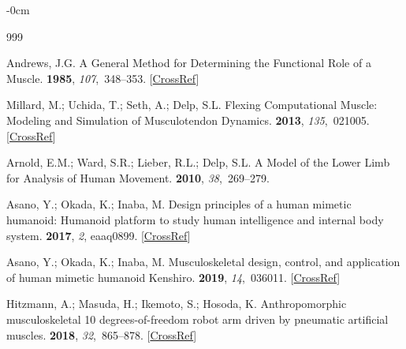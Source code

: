 \documentclass[actuators,article,accept,pdftex,moreauthors]{Definitions/mdpi}
\begin{document}
\clearpage
\begin{adjustwidth}{-\extralength}{0cm}

\begin{thebibliography}{999}

Andrews, J.G.
\newblock A {General} {Method} for {Determining} the {Functional} {Role} of a
{Muscle}.
 {\bf 1985}, {\em
107},~348--353. [\href{http://dx.doi.org/10.1115/1.3138568}{CrossRef}]

Millard, M.; Uchida, T.; Seth, A.; Delp, S.L.
\newblock Flexing {Computational} {Muscle}: {Modeling} and {Simulation} of
{Musculotendon} {Dynamics}.
 {\bf 2013}, {\em
135},~021005. [\href{http://dx.doi.org/10.1115/1.4023390}{CrossRef}]

Arnold, E.M.; Ward, S.R.; Lieber, R.L.; Delp, S.L.
\newblock A {Model} of the {Lower} {Limb} for {Analysis} of {Human} {Movement}.
 {\bf 2010}, {\em 38},{~269--279.}

Asano, Y.; Okada, K.; Inaba, M.
\newblock Design principles of a human mimetic humanoid: {Humanoid} platform to
study human intelligence and internal body system.
 {\bf 2017}, {\em 2}, eaaq0899. [\href{http://dx.doi.org/10.1126/scirobotics.aaq0899}{CrossRef}]

Asano, Y.; Okada, K.; Inaba, M.
\newblock Musculoskeletal design, control, and application of human mimetic
humanoid {Kenshiro}.
 {\bf 2019}, {\em 14},~036011. [\href{http://dx.doi.org/10.1088/1748-3190/ab03fc}{CrossRef}]

Hitzmann, A.; Masuda, H.; Ikemoto, S.; Hosoda, K.
\newblock Anthropomorphic musculoskeletal 10 degrees-of-freedom robot arm
driven by pneumatic artificial muscles.
 {\bf 2018}, {\em 32},~865--878. [\href{http://dx.doi.org/10.1080/01691864.2018.1494040}{CrossRef}]


\end{thebibliography}
\end{adjustwidth}
\end{document}

